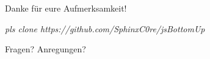 \documentclass{beamer}
\begin{document}

\begin{frame}
\Huge{\centerline{Danke für eure Aufmerksamkeit!}}
\begin{small}
\textit{pls clone https://github.com/SphinxC0re/jsBottomUp}
\end{small}
\end{frame}

\begin{frame}
\Huge{\centerline{Fragen? Anregungen?}}
\end{frame}

\end{document}
